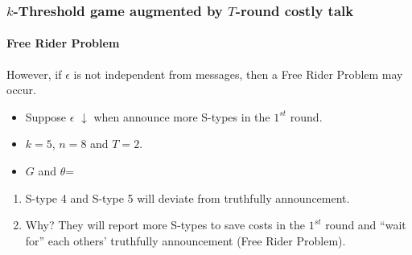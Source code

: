\documentclass[8pt]{beamer}
\begin{document}
\begin{frame}
   \frametitle{$k$-Threshold game augmented by $T$-round costly talk}
\framesubtitle{Free Rider Problem}

\alert{However}, if $\epsilon$ is \alert{not independent from messages}, then a \alert{Free Rider Problem} may occur.
\begin{itemize}
\item Suppose $\epsilon$ \alert{$\downarrow$} when announce \alert{more} S-types in the \alert{$1^{st}$} round.
\item $k=5$, $n=8$ and $T=2$.
\item $G$ and $\theta$=
\begin{center}
\end{center}



\end{itemize}

\begin{enumerate}
\item S-type \alert{4} and S-type \alert{5} will deviate from truthfully announcement.
\item Why? They will report more S-types to save costs in the $1^{st}$ round and ``wait for'' each others' truthfully announcement (Free Rider Problem).
\end{enumerate}


\end{frame}
\end{document}
